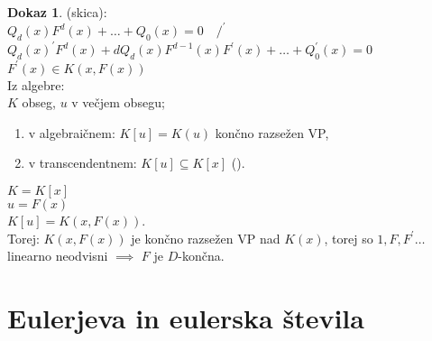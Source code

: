 \documentclass[a4paper, 12pt]{book}
\theoremstyle{definition}
\newtheorem{pro}[counter]{Dokaz}
\theoremstyle{remark}
\begin{document}
\begin{pro} (skica): \\
  $Q_d(x) F^d(x) + \dots + Q_0(x) = 0 \quad /^{'}$ \\
  $Q_d(x)^{'} F^d(x) + d Q_d(x) F^{d-1}(x) F^{'}(x) + \dots + Q_0^{'}(x) = 0$ \\
  $F^{'}(x) \in K(x, F(x))$ \\
  Iz algebre: \\
  $K$ obseg, $u$ v večjem obsegu;
  \begin{enumerate}[label={(\roman*)}]
    \item v algebraičnem: $K[u] = K(u)$ končno razsežen VP,
    \item v transcendentnem: $K[u] \subseteq K[x]$ ().
  \end{enumerate}
  $K = K[x]$ \\
  $u = F(x)$ \\
  $K[u] = K(x, F(x))$. \\
  Torej: $K(x, F(x))$ je končno razsežen VP nad $K(x)$, torej so $1, F, F^{'} \dots$ linearno neodvisni
  $\implies$ $F$ je $D$-končna.
\end{pro}


\section{Eulerjeva in eulerska števila}
\end{document}
